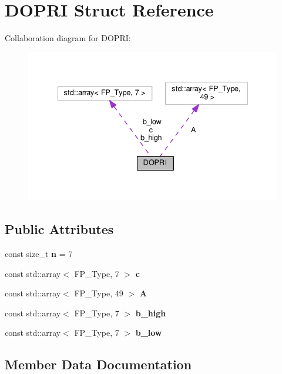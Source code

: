 \hypertarget{structDOPRI}{}\section{D\+O\+P\+RI Struct Reference}
\label{structDOPRI}


Collaboration diagram for D\+O\+P\+RI\+:\nopagebreak
\begin{figure}[H]
\begin{center}
\leavevmode
\includegraphics[width=336pt]{structDOPRI__coll__graph}
\end{center}
\end{figure}
\subsection*{Public Attributes}
\begin{DoxyCompactItemize}
\item 
\mbox{\label{structDOPRI_a3520af988d456d6f669ba92fae81cea2}} 
const size\+\_\+t {\bfseries n} = 7
\item 
const std\+::array$<$ F\+P\+\_\+\+Type, 7 $>$ {\bfseries c}
\item 
const std\+::array$<$ F\+P\+\_\+\+Type, 49 $>$ {\bfseries A}
\item 
const std\+::array$<$ F\+P\+\_\+\+Type, 7 $>$ {\bfseries b\+\_\+high}
\item 
const std\+::array$<$ F\+P\+\_\+\+Type, 7 $>$ {\bfseries b\+\_\+low}
\end{DoxyCompactItemize}


\subsection{Member Data Documentation}
\mbox{\label{structDOPRI_a65a11509e008348c328fa217fc7538a2}} 
